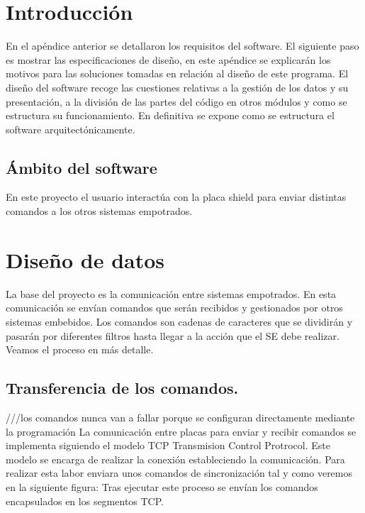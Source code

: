 \section{Introducción}
En el apéndice anterior se detallaron los requisitos del software. El siguiente paso es mostrar las especificaciones de diseño, en este apéndice se explicarán los motivos para las soluciones tomadas en relación al diseño de este programa. 
El diseño del software recoge las cuestiones relativas a la gestión de los datos y su presentación, a la división de las partes del código en otros módulos y como se estructura su funcionamiento. En definitiva se expone como se estructura el software arquitectónicamente.

\subsection{Ámbito del software}
En este proyecto el usuario interactúa con la placa shield para enviar distintas comandos a los otros sistemas empotrados. 
\section{Diseño de datos}
La base del proyecto es la comunicación entre sistemas empotrados. En esta comunicación se envían comandos que serán recibidos y gestionados por otros sistemas embebidos. Los comandos son cadenas de caracteres que se dividirán y pasarán por diferentes filtros hasta llegar a la acción que el SE debe realizar. Veamos el proceso en más detalle.
\subsection{Transferencia de los comandos.}
///los comandos nunca van a fallar porque se configuran directamente mediante la programación
La comunicación entre placas para enviar y recibir comandos se implementa siguiendo el modelo TCP Transmision Control Protrocol. Este modelo se encarga de realizar la conexión estableciendo la comunicación. Para realizar esta labor enviara unos comandos de sincronización tal y como veremos en la siguiente figura:
Tras ejecutar este proceso se envían los comandos encapsulados en los segmentos TCP.

